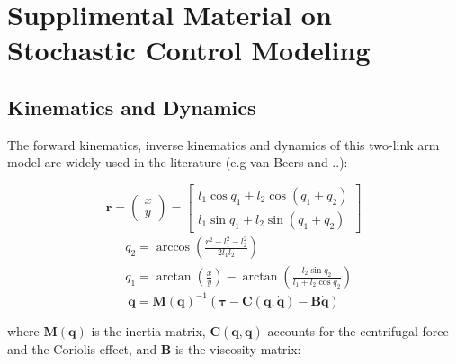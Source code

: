\section{Supplimental Material on Stochastic Control Modeling}
\label{app:oc}

\subsection{Kinematics and Dynamics}
\label{app:kindyn}
The forward kinematics, inverse kinematics and dynamics of this two-link arm model are widely used in the literature (e.g van Beers and ..):

\begin{equation}
\bm{r} =\left(\begin{matrix} x\\y \end{matrix}\right) %
= \left[ \begin{matrix}  l_1\cos{q_1} + l_2\cos{(q_1+q_2)} \\ l_1\sin{q_1} + l_2\sin{(q_1+q_2)}  \end{matrix} \right]
\end{equation}
\begin{equation}
\begin{split}
& q_2 = \arccos{\left(\frac{r^2-l_1^2-l_2^2}{2l_1l_2}\right)} \\
& q_1 = \arctan{\left( \frac{x}{y} \right)} - \arctan{\left(\frac{l_2\sin{q_2}}{l_1+l_2\cos q_2 }\right)}
\end{split}
\end{equation}
\begin{equation} \label{dynamics}
\ddot{\bm{q}} = \bm{M}(\bm{q})^{-1} (\bm{\tau} - \bm{C}(\bm{q}, \dot{\bm{q}}) - \bm{B}\dot{\bm{q}})
\end{equation}

where $\bm{M}(\bm{q})$ is the inertia matrix, $\bm{C}(\bm{q}, \dot{\bm{q}})$ accounts for the centrifugal force and the Coriolis effect, and $\bm{B}$ is the viscosity matrix:

